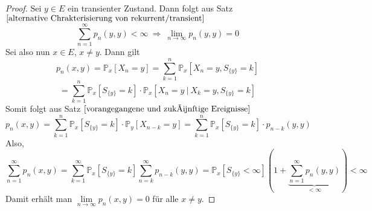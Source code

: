 \documentclass[a4paper,12pt]{scrartcl}
\theoremstyle{definition}
\begin{document}
\begin{proof}
Sei $y \in E$ ein transienter Zustand. Dann folgt aus Satz $\ref{alternative Chrakterisierung von rekurrent/transient}$
\begin{equation*}
\sum_{n=1}^{\infty} p_{n}(y,y) < \infty \: \Rightarrow \: \lim_{n \to \infty} p_{n}(y,y) = 0
\end{equation*}
Sei also nun $x \in E$, $x \neq y$. Dann gilt
\begin{equation*}
p_{n}(x,y) = \mathbb{P}_{x}[X_{n} = y] = \sum_{k=1}^{n} \mathbb{P}_{x}[X_{n} = y, S_{\lbrace y \rbrace} = k]
\end{equation*}
\begin{equation*}
= \sum_{k=1}^{n} \mathbb{P}_{x}[S_{\lbrace y \rbrace} = k] \cdot \mathbb{P}_{x}[X_{n} = y \: | \: X_{k} = y, S_{\lbrace y \rbrace} = k] 
\end{equation*}
Somit folgt aus Satz $\ref{vorangegangene und zukünftige Ereignisse}$
\begin{equation*}
p_{n}(x,y) = \sum_{k=1}^{n} \mathbb{P}_{x}[S_{\lbrace y \rbrace} = k] \cdot \mathbb{P}_{y}[X_{n-k} = y] = \sum_{k=1}^{n} \mathbb{P}_{x}[S_{\lbrace y \rbrace} = k] \cdot p_{n-k}(y,y)
\end{equation*}
Also,
\begin{equation*}
\sum_{n=1}^{\infty} p_{n}(x,y) = \sum_{k=1}^{\infty} \mathbb{P}_{x}[S_{\lbrace y \rbrace} = k] \sum_{n=k}^{\infty} p_{n-k}(y,y) = \mathbb{P}_{x}[S_{\lbrace y \rbrace} < \infty](1 + \underbrace{\sum_{n=1}^{\infty} p_{n}(y,y)}_{< \infty}) < \infty
\end{equation*}
Damit erhält man $\lim \limits_{n \to \infty} p_{n}(x,y) = 0$ für alle $x \neq y$.
\end{proof}
\end{document}
